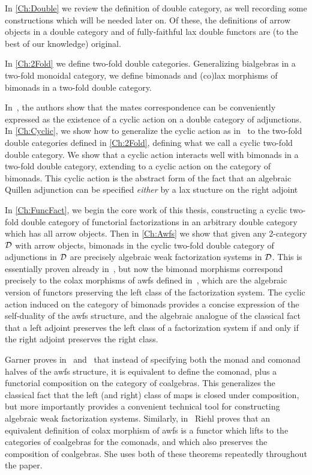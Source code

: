 In \cref{Ch:Double} we review the definition of double category, as well recording some constructions which will be needed later on. Of these, the definitions of arrow objects in a double category and of fully-faithful lax double functors are (to the best of our knowledge) original.

In \cref{Ch:2Fold} we define two-fold double categories. Generalizing bialgebras in a two-fold monoidal category, we define bimonads and (co)lax morphisms of bimonads in a two-fold double category.

In~\cite{cgr:mates}, the authors show that the mates correspondence can be conveniently expressed as the existence of a cyclic action on a double category of adjunctions. In \cref{Ch:Cyclic}, we show how to generalize the cyclic action as in~\cite{cgr:mates} to the two-fold double categories defined in \cref{Ch:2Fold}, defining what we call a cyclic two-fold double category. We show that a cyclic action interacts well with bimonads in a two-fold double category, extending to a cyclic action on the category of bimonads. This cyclic action is the abstract form of the fact that an algebraic Quillen adjunction can be specified \emph{either} by a lax stucture on the right adjoint \emph{}

In \cref{Ch:FuncFact}, we begin the core work of this thesis, constructing a cyclic two-fold double category of functorial factorizations in an arbitrary double category which has all arrow objects. Then in \cref{Ch:Awfs} we show that given any 2-category $\mathcal{D}$ with arrow objects, bimonads in the cyclic two-fold double category of adjunctions in $\mathcal{D}$ are precisely algebraic weak factorization systems in $\mathcal{D}$. This is essentially proven already in~\cite{garner:nwfs}, but now the bimonad morphisms correspond precisely to the colax morphisms of awfs defined in~\cite{riehl:nwfs-model}, which are the algebraic version of functors preserving the left class of the factorization system. The cyclic action induced on the category of bimonads provides a concise expression of the self-duality of the awfs structure, and the algebraic analogue of the classical fact that a left adjoint preserves the left class of a factorization system if and only if the right adjoint preserves the right class.

Garner proves in~\cite{garner:nwfs} and~\cite{garner:soa} that instead of specifying both the monad and comonad halves of the awfs structure, it is equivalent to define the comonad, plus a functorial composition on the category of coalgebras. This generalizes the classical fact that the left (and right) class of maps is closed under composition, but more importantly provides a convenient technical tool for constructing algebraic weak factorization systems. Similarly, in~\cite{riehl:nwfs-model} Riehl proves that an equivalent definition of colax morphism of awfs is a functor which lifts to the categories of coalgebras for the comonads, and which also preserves the composition of coalgebras. She uses both of these theorems repeatedly throughout the paper.

